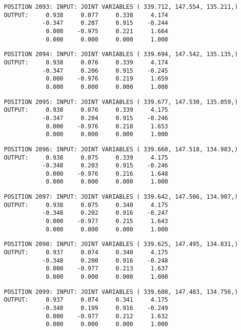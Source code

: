 \begin{verbatim}
POSITION 2093: INPUT: JOINT VARIABLES ( 339.712, 147.554, 135.211,)
OUTPUT:     0.938     0.077     0.338     4.174
           -0.347     0.207     0.915    -0.244
            0.000    -0.975     0.221     1.664
            0.000     0.000     0.000     1.000
\end{verbatim} \pagebreak[1]\begin{verbatim}
POSITION 2094: INPUT: JOINT VARIABLES ( 339.694, 147.542, 135.135,)
OUTPUT:     0.938     0.076     0.339     4.174
           -0.347     0.206     0.915    -0.245
            0.000    -0.976     0.219     1.659
            0.000     0.000     0.000     1.000
\end{verbatim} \pagebreak[1]\begin{verbatim}
POSITION 2095: INPUT: JOINT VARIABLES ( 339.677, 147.530, 135.059,)
OUTPUT:     0.938     0.076     0.339     4.175
           -0.347     0.204     0.915    -0.246
            0.000    -0.976     0.218     1.653
            0.000     0.000     0.000     1.000
\end{verbatim} \pagebreak[1]\begin{verbatim}
POSITION 2096: INPUT: JOINT VARIABLES ( 339.660, 147.518, 134.983,)
OUTPUT:     0.938     0.075     0.339     4.175
           -0.348     0.203     0.915    -0.246
            0.000    -0.976     0.216     1.648
            0.000     0.000     0.000     1.000
\end{verbatim} \pagebreak[1]\begin{verbatim}
POSITION 2097: INPUT: JOINT VARIABLES ( 339.642, 147.506, 134.907,)
OUTPUT:     0.938     0.075     0.340     4.175
           -0.348     0.202     0.916    -0.247
            0.000    -0.977     0.215     1.643
            0.000     0.000     0.000     1.000
\end{verbatim} \pagebreak[1]\begin{verbatim}
POSITION 2098: INPUT: JOINT VARIABLES ( 339.625, 147.495, 134.831,)
OUTPUT:     0.937     0.074     0.340     4.175
           -0.348     0.200     0.916    -0.248
            0.000    -0.977     0.213     1.637
            0.000     0.000     0.000     1.000
\end{verbatim} \pagebreak[1]\begin{verbatim}
POSITION 2099: INPUT: JOINT VARIABLES ( 339.608, 147.483, 134.756,)
OUTPUT:     0.937     0.074     0.341     4.175
           -0.348     0.199     0.916    -0.249
            0.000    -0.977     0.212     1.632
            0.000     0.000     0.000     1.000
\end{verbatim} \pagebreak[1]\begin{verbatim}

\end{verbatim}
